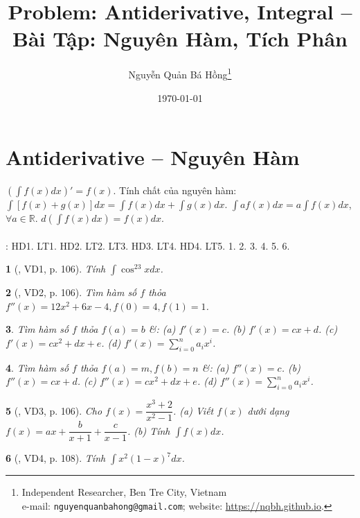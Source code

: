 \documentclass{article}
\title{Problem: Antiderivative, Integral -- Bài Tập: Nguyên Hàm, Tích Phân}
\author{Nguyễn Quản Bá Hồng\footnote{Independent Researcher, Ben Tre City, Vietnam\\e-mail: \texttt{nguyenquanbahong@gmail.com}; website: \url{https://nqbh.github.io}.}}
\date{\today}
\newtheorem{baitoan}{}
\begin{document}
\maketitle
\tableofcontents


\section{Antiderivative -- Nguyên Hàm}
 $\left(\int f(x)dx\right)' = f(x)$.  {\sf Tính chất của nguyên hàm}: $\int [f(x) + g(x)]dx = \int f(x)dx + \int g(x)dx$. $\int af(x)dx = a\int f(x)dx$, $\forall a\in\mathbb{R}$. $d\left(\int f(x)dx\right) = f(x)dx$.\\
\\
\noindent\cite[Chap. IV, \S1, pp. 3--8]{SGK_Toan_12_Canh_Dieu_tap_2}: HD1. LT1. HD2. LT2. LT3. HD3. LT4. HD4. LT5. 1. 2. 3. 4. 5. 6.

\begin{baitoan}[\cite{TLCT_giai_tich_12}, VD1, p. 106]
	Tính $\int \cos^23xdx$.
\end{baitoan}

\begin{baitoan}[\cite{TLCT_giai_tich_12}, VD2, p. 106]
	Tìm hàm số $f$ thỏa $f''(x) = 12x^2 + 6x - 4,f(0) = 4,f(1) = 1$.
\end{baitoan}

\begin{baitoan}
	Tìm hàm số $f$ thỏa $f(a) = b$ \&: (a) $f'(x) = c$. (b) $f'(x) = cx + d$. (c) $f'(x) = cx^2 + dx + e$. (d) $f'(x) = \sum_{i=0}^n a_ix^i$.
\end{baitoan}

\begin{baitoan}
	Tìm hàm số $f$ thỏa $f(a) = m,f(b) = n$ \&: (a) $f''(x) = c$. (b) $f''(x) = cx + d$. (c) $f''(x) = cx^2 + dx + e$. (d) $f''(x) = \sum_{i=0}^n a_ix^i$.
\end{baitoan}

\begin{baitoan}[\cite{TLCT_giai_tich_12}, VD3, p. 106]
	Cho $f(x) = \dfrac{x^3 + 2}{x^2 - 1}$. (a) Viết $f(x)$ dưới dạng $f(x) = ax + \dfrac{b}{x + 1} + \dfrac{c}{x - 1}$. (b) Tính $\int f(x)dx$.
\end{baitoan}

\begin{baitoan}[\cite{TLCT_giai_tich_12}, VD4, p. 108]
	Tính $\int x^2(1 - x)^7dx$.
\end{baitoan}
\end{document}
